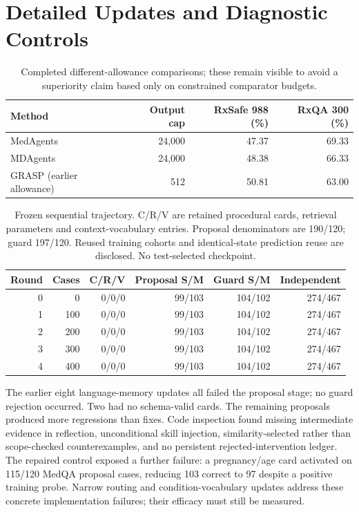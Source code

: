 \section{Detailed Updates and Diagnostic Controls}\label{app:updates}
\begin{table}[t]\centering\small
\setlength{\tabcolsep}{4pt}
\caption{Completed different-allowance comparisons; these remain visible to avoid a superiority claim based only on constrained comparator budgets.}
\label{tab:native}
\begin{tabular}{@{}lrrr@{}}\toprule
Method & Output cap & RxSafe 988 (\%) & RxQA 300 (\%)\\\midrule
MedAgents & 24,000 & 47.37 & 69.33\\
MDAgents & 24,000 & 48.38 & 66.33\\
GRASP (earlier allowance) & 512 & 50.81 & 63.00\\
\bottomrule\end{tabular}
\end{table}
\begin{table}[t]\centering\small
\setlength{\tabcolsep}{4pt}
\caption{Frozen sequential trajectory. C/R/V are retained procedural cards, retrieval parameters and context-vocabulary entries. Proposal denominators are 190/120; guard 197/120. Reused training cohorts and identical-state prediction reuse are disclosed. No test-selected checkpoint.}
\label{tab:trajectory}
\begin{tabular}{@{}rrrrrr@{}}\toprule
Round & Cases & C/R/V & Proposal S/M & Guard S/M & Independent\\\midrule
0 & 0 & 0/0/0 & 99/103 & 104/102 & 274/467\\
1 & 100 & 0/0/0 & 99/103 & 104/102 & 274/467\\
2 & 200 & 0/0/0 & 99/103 & 104/102 & 274/467\\
3 & 300 & 0/0/0 & 99/103 & 104/102 & 274/467\\
4 & 400 & 0/0/0 & 99/103 & 104/102 & 274/467\\
\bottomrule\end{tabular}
\end{table}
The earlier eight language-memory updates all failed the proposal stage; no guard rejection occurred. Two had no schema-valid cards. The remaining proposals produced more regressions than fixes. Code inspection found missing intermediate evidence in reflection, unconditional skill injection, similarity-selected rather than scope-checked counterexamples, and no persistent rejected-intervention ledger. The repaired control exposed a further failure: a pregnancy/age card activated on 115/120 MedQA proposal cases, reducing 103 correct to 97 despite a positive training probe. Narrow routing and condition-vocabulary updates address these concrete implementation failures; their efficacy must still be measured.
